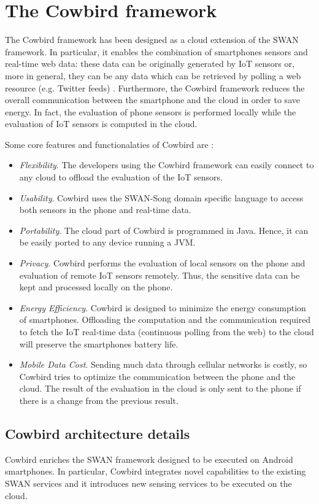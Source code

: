 \section{The Cowbird framework}
The Cowbird framework has been designed as a cloud extension of the SWAN framework. In particular, it enables the combination of smartphones sensors and real-time web data: these data can be originally generated by IoT sensors or, more in general, they can be any data which can be retrieved by polling a web resource (e.g. Twitter feeds) \cite{cowbirdarticle}. Furthermore, the Cowbird framework reduces the overall communication between the smartphone and the cloud in order to save energy. In fact, the evaluation of phone sensors is performed locally while the evaluation of IoT sensors is computed in the cloud.

Some core features and functionalaties of Cowbird are \cite{cowbirdarticle}:
\begin{itemize}
\item \emph{Flexibility}. The developers using the Cowbird framework
can easily connect to any cloud to offload the evaluation of the IoT sensors.
\item \emph{Usability}. Cowbird uses the SWAN-Song domain specific language to access both sensors in the phone and real-time data.
\item \emph{Portability}. The cloud part of Cowbird is programmed in
Java. Hence, it can be easily ported to any device running a JVM.
\item \emph{Privacy}. Cowbird performs the evaluation of local sensors
on the phone and evaluation of remote IoT sensors remotely. Thus, the sensitive data can be kept and processed locally on the phone.
\item \emph{Energy Efficiency}. Cowbird is designed to minimize the energy consumption of smartphones. Offloading the computation and the communication required to fetch the IoT real-time data (continuous polling from the web) to the cloud will preserve the smartphones battery life.
\item \emph{Mobile Data Cost}. Sending much data through cellular
networks is costly, so Cowbird tries to optimize the communication between the phone and the cloud. The result of the evaluation in the cloud is only sent to the phone if there is a change from the previous result. 
\end{itemize}
\subsection{Cowbird architecture details}
Cowbird enriches the SWAN framework designed to be executed on Android smartphones. In particular, Cowbird integrates novel capabilities to the existing SWAN services and it introduces new sensing services to be executed on the cloud. 

